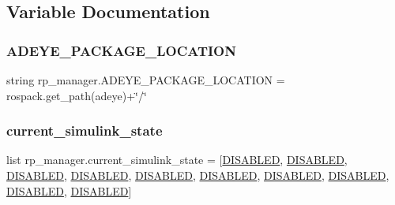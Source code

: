 \subsection{Variable Documentation}
\mbox{\label{namespacerp__manager_a86043a0cf61411011e16931d9164b284}} 
\subsubsection{\texorpdfstring{A\+D\+E\+Y\+E\+\_\+\+P\+A\+C\+K\+A\+G\+E\+\_\+\+L\+O\+C\+A\+T\+I\+ON}{ADEYE\_PACKAGE\_LOCATION}}
{\footnotesize\ttfamily string rp\+\_\+manager.\+A\+D\+E\+Y\+E\+\_\+\+P\+A\+C\+K\+A\+G\+E\+\_\+\+L\+O\+C\+A\+T\+I\+ON = rospack.\+get\+\_\+path(\textquotesingle{}adeye\textquotesingle{})+\char`\"{}/\char`\"{}}

\mbox{\label{namespacerp__manager_a85cdd1b22b56bd5cc90234794b44872c}} 
\subsubsection{\texorpdfstring{current\+\_\+simulink\+\_\+state}{current\_simulink\_state}}
{\footnotesize\ttfamily list rp\+\_\+manager.\+current\+\_\+simulink\+\_\+state = \mbox{[}\hyperlink{namespacerp__manager_af85e17f72f768eba5168eba56041bd69}{D\+I\+S\+A\+B\+L\+ED}, \hyperlink{namespacerp__manager_af85e17f72f768eba5168eba56041bd69}{D\+I\+S\+A\+B\+L\+ED}, \hyperlink{namespacerp__manager_af85e17f72f768eba5168eba56041bd69}{D\+I\+S\+A\+B\+L\+ED}, \hyperlink{namespacerp__manager_af85e17f72f768eba5168eba56041bd69}{D\+I\+S\+A\+B\+L\+ED}, \hyperlink{namespacerp__manager_af85e17f72f768eba5168eba56041bd69}{D\+I\+S\+A\+B\+L\+ED}, \hyperlink{namespacerp__manager_af85e17f72f768eba5168eba56041bd69}{D\+I\+S\+A\+B\+L\+ED}, \hyperlink{namespacerp__manager_af85e17f72f768eba5168eba56041bd69}{D\+I\+S\+A\+B\+L\+ED}, \hyperlink{namespacerp__manager_af85e17f72f768eba5168eba56041bd69}{D\+I\+S\+A\+B\+L\+ED}, \hyperlink{namespacerp__manager_af85e17f72f768eba5168eba56041bd69}{D\+I\+S\+A\+B\+L\+ED}, \hyperlink{namespacerp__manager_af85e17f72f768eba5168eba56041bd69}{D\+I\+S\+A\+B\+L\+ED}\mbox{]}}

